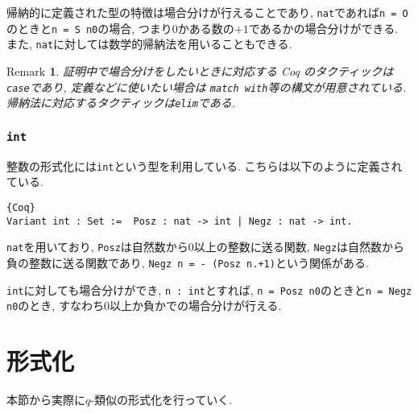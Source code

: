 \documentclass[11pt]{jsreport}
\theoremstyle{mystyle}
\newtheorem{rmk}[df]{$\textrm{Remark}$}
\newcommand{\brmk}{\begin{rmk}}
\newcommand{\ermk}{\end{rmk}}
\newcommand{\0}{\textbf{0}}
\begin{document}
帰納的に定義された型の特徴は場合分けが行えることであり, {\tt nat}であれば{\tt n = O}のときと{\tt n = S n0}の場合, つまり$0$かある数の$+1$であるかの場合分けができる. また, {\tt nat}に対しては数学的帰納法を用いることもできる.
\brmk
  証明中で場合分けをしたいときに対応する Coq のタクティックは{\tt case}であり, 
  定義などに使いたい場合は  {\tt match with}等の構文が用意されている. 
  帰納法に対応するタクティックは{\tt elim}である. 
\ermk
\subsubsection*{\tt int}
整数の形式化には{\tt int}という型を利用している. こちらは以下のように定義されている. 
\begin{lstlisting}{Coq}
Variant int : Set :=  Posz : nat -> int | Negz : nat -> int. \end{lstlisting}
{\tt nat}を用いており, {\tt Posz}は自然数から$0$以上の整数に送る関数, {\tt Negz}は自然数から負の整数に送る関数であり, {\tt Negz n = - (Posz n.+1)}という関係がある. 

{\tt int}に対しても場合分けができ, {\tt n : int}とすれば, {\tt n = Posz n0}のときと{\tt n = Negz n0}のとき, すなわち0以上か負かでの場合分けが行える. 
\section{形式化}\label{sec form}
本節から実際に$q$-類似の形式化を行っていく. 
\end{document}

